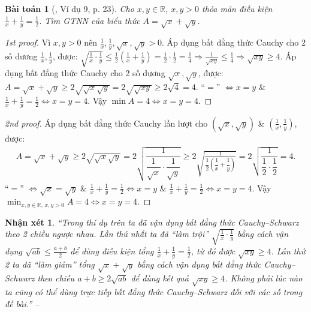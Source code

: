 \documentclass{article}
\newtheorem{baitoan}{Bài toán}
\newtheorem{nhanxet}{Nhận xét}
\begin{document}
\begin{baitoan}[\cite{Tuyen_Toan_9}, Ví dụ 9, p. 23]
	Cho $x,y\in\mathbb{R}$, $x,y > 0$ thỏa mãn điều kiện $\frac{1}{x} + \frac{1}{y} = \frac{1}{2}$. Tìm {\rm GTNN} của biểu thức $A = \sqrt{x} + \sqrt{y}$.
\end{baitoan}

\begin{proof}[1st proof]
	Vì $x,y > 0$ nên $\frac{1}{x},\frac{1}{y},\sqrt{x},\sqrt{y} > 0$. Áp dụng bất đẳng thức Cauchy cho 2 số dương $\frac{1}{x},\frac{1}{y}$, được: $\sqrt{\frac{1}{x}\cdot\frac{1}{y}}\le\frac{1}{2}\left(\frac{1}{x} + \frac{1}{y}\right) = \frac{1}{2}\cdot\frac{1}{2} = \frac{1}{4}\Rightarrow\frac{1}{\sqrt{xy}}\le\frac{1}{4}\Rightarrow\sqrt{xy}\ge4$. Áp dụng bất đẳng thức Cauchy cho 2 số dương $\sqrt{x},\sqrt{y}$, được: $A = \sqrt{x} + \sqrt{y}\ge2\sqrt{\sqrt{x}\sqrt{y}} = 2\sqrt{\sqrt{xy}}\ge2\sqrt{4} = 4$. ``$=$'' $\Leftrightarrow x = y$ \& $\frac{1}{x} + \frac{1}{y} = \frac{1}{2}\Leftrightarrow x = y = 4$. Vậy $\min A = 4\Leftrightarrow x = y = 4$.
\end{proof}

\begin{proof}[2nd proof]
	Áp dụng bất đẳng thức Cauchy lần lượt cho $(\sqrt{x},\sqrt{y})$ \& $\left(\frac{1}{x},\frac{1}{y}\right)$, được:
	\begin{align*}
		A = \sqrt{x} + \sqrt{y}\ge2\sqrt{\sqrt{x}\sqrt{y}} = 2\sqrt{\dfrac{1}{\dfrac{1}{\sqrt{x}}\cdot\dfrac{1}{\sqrt{y}}}}\ge2\sqrt{\frac{1}{\dfrac{1}{2}\left(\dfrac{1}{x} + \dfrac{1}{y}\right)}} = 2\sqrt{\dfrac{1}{\dfrac{1}{2}\cdot\dfrac{1}{2}}} = 4.
	\end{align*}
	``$=$'' $\Leftrightarrow \sqrt{x} = \sqrt{y}$ \& $\frac{1}{x} + \frac{1}{y} = \frac{1}{2}\Leftrightarrow x = y$ \& $\frac{1}{x} + \frac{1}{y} = \frac{1}{2}\Leftrightarrow x = y = 4$. Vậy $\min_{x,y\in\mathbb{R},\,x,y > 0} A = 4\Leftrightarrow x = y = 4$.
\end{proof}

\begin{nhanxet}
	``Trong thí dụ trên ta đã vận dụng bất đẳng thức Cauchy--Schwarz theo 2 chiều ngược nhau. Lần thứ nhất ta đã ``làm trội'' $\sqrt{\frac{1}{x}\cdot\frac{1}{y}}$ bằng cách vận dụng $\sqrt{ab}\le\frac{a + b}{2}$ để dùng điều kiện tổng $\frac{1}{x} + \frac{1}{y} = \frac{1}{2}$, từ đó được $\sqrt{xy}\ge4$. Lần thứ 2 ta đã ``làm giảm'' tổng $\sqrt{x} + \sqrt{y}$ bằng cách vận dụng bất đẳng thức Cauchy--Schwarz theo chiều $a + b\ge2\sqrt{ab}$ để dùng kết quả $\sqrt{xy}\ge4$. Không phải lúc nào ta cũng có thể dùng trực tiếp bất đẳng thức Cauchy--Schwarz đối với các số trong đề bài.'' -- \emph{\cite[p. 24]{Tuyen_Toan_9}}
\end{nhanxet}
\end{document}

